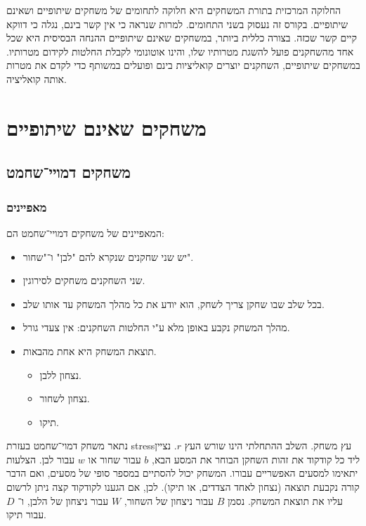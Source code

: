 \documentclass[a4paper,10pt,twoside,openany]{book}
\begin{document}
החלוקה המרכזית בתורת המשחקים היא חלוקה לתחומים של משחקים שיתופיים ושאינם שיתופיים.
בקורס זה נעסוק בשני התחומים. למרות שנראה כי אין קשר בינם, נגלה כי דווקא קיים קשר שכזה.
בצורה כללית ביותר, במשחקים שאינם שיתופיים ההנחה הבסיסית היא שכל אחד מהשחקנים פועל להשגת מטרותיו שלו, והינו אוטונומי לקבלת החלטות לקידום מטרותיו.
במשחקים שיתופיים, השחקנים יוצרים קואליציות בינם ופועלים במשותף כדי לקדם את מטרות אותה קואליציה.

\mainmatter

\part{משחקים שאינם שיתופיים}

\chapter{משחקים דמויי־שחמט}

\section{מאפיינים}

המאפיינים של משחקים דמויי־שחמט הם:%
\begin{itemize}
\item יש שני שחקנים
שנקרא להם "לבן" ו־"שחור".
\item שני השחקנים משחקים לסירוגין.
\item בכל שלב שבו שחקן צריך לשחק, הוא יודע את כל מהלך המשחק עד אותו שלב.
\item מהלך המשחק נקבע באופן מלא ע"י החלטות השחקנים: אין צעדי גורל.
\item תוצאת המשחק היא אחת מהבאות.
\begin{itemize}
\item נצחון ללבן.
\item נצחון לשחור.
\item תיקו.
\end{itemize}
\end{itemize}

נתאר משחק דמוי־שחמט בעזרת
stress{עץ משחק}.
השלב ההתחלתי הינו שורש העץ
$r$.
נציין ליד כל קודקוד את זהות השחקן הבוחר את המסע הבא,
$b$
עבור שחור או
$w$
עבור לבן.
הצלעות יתאימו למסעים האפשריים עבורו.
המשחק יכול להסתיים במספר סופי של מסעים, ואם הדבר קורה נקבעת תוצאה (נצחון לאחד הצדדים, או תיקו). לכן, אם הגענו לקודקוד קצה ניתן לרשום עליו את תוצאת המשחק. נסמן
$B$
עבור ניצחון של השחור,
$W$
עבור ניצחון של הלבן, ו־%
$D$
עבור תיקו.
\end{document}
